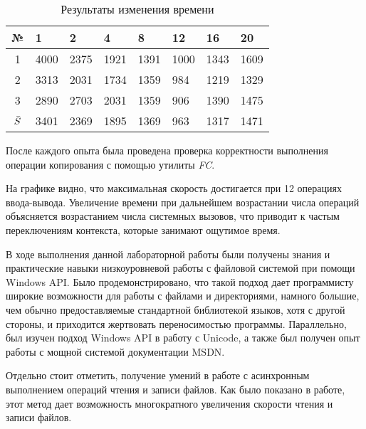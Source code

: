 \documentclass[a4paper,14pt]{extarticle}
\newcommand{\Code}[1]{\textit{#1}}
\begin{document}
\begin{table}[H]
    \centering
    \begin{tabularx}{\textwidth}{|c|X|X|X|X|X|X|X|}
        \hline
                № & 1 & 2 & 4 & 8 & 12 & 16 & 20 \\
        \hline
                1 & 4000 & 2375 & 1921 & 1391 & 1000 & 1343 & 1609 \\
        \hline
                2 & 3313 & 2031 & 1734 & 1359 & 984  & 1219 & 1329 \\
        \hline
                3 & 2890 & 2703 & 2031 & 1359 & 906  & 1390 & 1475 \\
        \hline
        $\Bar{S}$ & 3401 & 2369 & 1895 & 1369 & 963  & 1317 & 1471 \\
        \hline
    \end{tabularx}
    \caption{Результаты изменения времени}
\end{table}

После каждого опыта была проведена проверка корректности выполнения операции
копирования с помощью утилиты \Code{FC}.


На графике видно, что максимальная скорость достигается при 12 операциях
ввода-вывода. Увеличение времени при дальнейшем возрастании числа операций
объясняется возрастанием числа системных вызовов, что приводит к частым
переключениям контекста, которые занимают ощутимое время.


\clearpage



В ходе выполнения данной лабораторной работы были получены знания и практические навыки
низкоуровневой работы с файловой системой при помощи Windows API. Было
продемонстрировано, что такой подход дает программисту широкие возможности для
работы с файлами и директориями, намного большие, чем обычно предоставляемые
стандартной библиотекой языков, хотя с другой стороны, и приходится жертвовать
переносимостью программы. Параллельно, был изучен подход Windows API в работу с
Unicode, а также был получен опыт работы с мощной системой документации MSDN.

Отдельно стоит отметить, получение умений в работе с асинхронным выполнением
операций чтения и записи файлов. Как было показано в работе, этот метод дает
возможность многократного увеличения скорости чтения и записи файлов.
\end{document}
